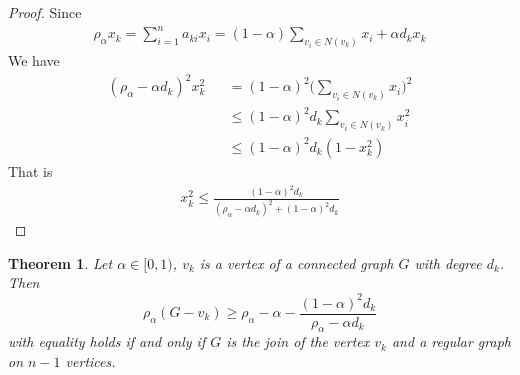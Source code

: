 \documentclass[amsthm]{elsart}
\newtheorem{theorem}{Theorem}[section]
\begin{document}
\begin{proof}
Since
\begin{eqnarray*}
\rho _\alpha x_k = \sum \limits_{i = 1}^{n} a_{ki} x_i = (1 - \alpha) \sum \limits_{v_i \in N(v_k)}^{} x_i + \alpha d_k x_k
\end{eqnarray*}
We have
\begin{eqnarray*}
 (\rho _\alpha - \alpha d_k)^2 x_k^2
    &&= (1 - \alpha)^2 \big(\sum \limits_{v_i \in N(v_k)}^{} x_i \big)^2
    \\ &&\leqslant  (1 - \alpha)^2 d_k \sum \limits_{v_i \in N(v_k)}^{} x_i^2
    \\ &&\leqslant  (1 - \alpha)^2 d_k (1 - x_k^2)
\end{eqnarray*}
That is
\begin{eqnarray*}
x_k^2 \leqslant \frac{(1 - \alpha)^2 d_k}{(\rho _\alpha - \alpha d_k)^2 + (1 - \alpha)^2 d_k}
\end{eqnarray*}
\end{proof}

\begin{theorem} \label{the:4}
Let $\alpha \in [0, 1)$, $v_k$ is a vertex of a connected graph $G$ with degree $d_k$.  Then
\begin{equation} \label{equ:16}
\rho _\alpha (G - v_k)
  \geqslant \rho _\alpha - \alpha - \frac{(1 - \alpha)^2 d_k}{\rho _\alpha - \alpha d_k}
\end{equation}
with equality holds if and only if $G$ is the join of the vertex $v_k$ and a regular graph on $n-1$ vertices.
\end{theorem}
\end{document}
